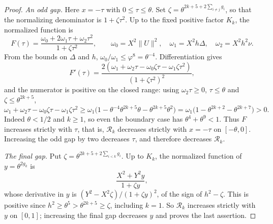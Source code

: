 \begin{proof}
\emph{An odd gap.} Here $x=-\tau$ with $0\leqslant\tau\leqslant\theta$. Set
$\zeta=\theta^{2k+5+2\sum_{i\ne j}g_i}$, so that the normalizing denominator is
$1+\zeta\tau^2$. Up to the fixed positive factor $K_k$, the normalized
function is
$$
 F(\tau)=\frac{\omega_0+2\omega_1\tau+\omega_2\tau^2}{1+\zeta\tau^2},\qquad
 \omega_0=X^2\lVert U\rVert^2,\quad \omega_1=X^2h\Delta,\quad \omega_2=X^2h^2\nu.
$$
From the bounds on $\Delta$ and $h$, $\omega_0/\omega_1\leqslant\varphi^8=\theta^{-4}$.
Differentiation gives
$$
 F'(\tau)=\frac{2(\omega_1+\omega_2\tau-\omega_0\zeta\tau-\omega_1\zeta\tau^2)}{(1+\zeta\tau^2)^2},
$$
and the numerator is positive on the closed range: using $\omega_2\tau\geqslant0$,
$\tau\leqslant\theta$ and $\zeta\leqslant\theta^{2k+5}$,
$$
 \omega_1+\omega_2\tau-\omega_0\zeta\tau-\omega_1\zeta\tau^2
 \geqslant \omega_1\bigl(1-\theta^{-4}\theta^{2k+5}\theta-\theta^{2k+5}\theta^2\bigr)
 =\omega_1\bigl(1-\theta^{2k+2}-\theta^{2k+7}\bigr)>0.
$$
Indeed $\theta<1/2$ and $k\geqslant1$, so even the boundary case has
$\theta^4+\theta^9<1$. Thus $F$ increases strictly with $\tau$, that is,
$\mathcal R_k$ decreases strictly with $x=-\tau$ on $[-\theta,0]$. Increasing the
odd gap by two decreases $\tau$, and therefore decreases $\mathcal R_k$.

\emph{The final gap.} Put $\zeta=\theta^{2k+5+2\sum_{i<k}g_i}$. Up to $K_k$, the
normalized function of $y=\theta^{2g_k}$ is
$$
 \frac{X^2+Y^2y}{1+\zeta y},
$$
whose derivative in $y$ is $(Y^2-X^2\zeta)/(1+\zeta y)^2$, of the sign of
$h^2-\zeta$. This is positive since $h^2\geqslant\theta^5>\theta^{2k+5}\geqslant\zeta$,
including $k=1$. So $\mathcal R_k$ increases strictly with $y$ on $[0,1]$;
increasing the final gap decreases $y$ and proves the last assertion.


\end{proof}
